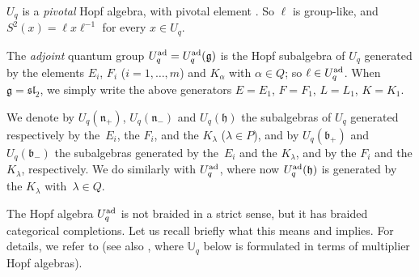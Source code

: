 \documentclass[10pt,a4paper]{amsart}
\numberwithin{equation}{section}
\theoremstyle{definition}
\newcommand{\mUq}{\mathbb{U}_q}
\begin{document}
$U_q$ is a {\it pivotal} Hopf algebra, with pivotal element .
So $\ell$ is group-like, and $S^2(x) = \ell x\ell^{-1}$ for every $x\in U_q$.

The {\it adjoint} quantum group $U_q^{\rm ad} = U_q^{\rm ad}(\mathfrak{g})$ is the Hopf subalgebra of $U_q$ generated by the elements $E_i$, $F_i$ ($i=1,\dots,m$) and $K_\alpha$ with $\alpha\in Q$; so $\ell\in U_q^{\rm ad}$. When $\mathfrak{g}={\mathfrak{sl}_2}$, we simply write the above generators $E=E_1$, $F=F_1$, $L=L_1$, $K=K_1$.

We denote by $U_q(\mathfrak{n}_+)$, $U_q(\mathfrak{n}_-)$ and $U_q(\mathfrak{h})$ the subalgebras of $U_q$ generated respectively by the~$E_i$, the $F_i$, and the $K_\lambda$ ($\lambda\in P$), and by $U_q(\mathfrak{b}_+)$ and $U_q(\mathfrak{b}_-)$ the subalgebras generated by the~$E_i$ and the $K_\lambda$, and by the $F_i$ and the $K_\lambda$, respectively. We do similarly with $U_q^{\rm ad}$, where now $U_q^{\rm ad}(\mathfrak{h})$ is generated by the $K_\lambda$ with~$\lambda\in Q$.

The Hopf algebra $U_q^{\rm ad}$ is not braided in a strict sense, but it has braided categorical completions. Let us recall briefly what this means and implies. For details, we refer to \cite[Sections~2 and~3]{BR} (see also \cite[Section~3.10]{VY}, where $\mUq$ below is formulated in terms of multiplier Hopf algebras).
\end{document}
